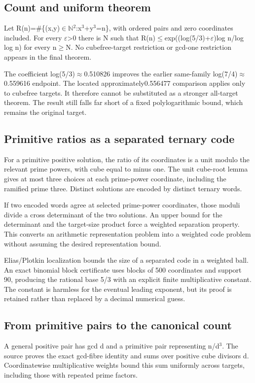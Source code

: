 \documentclass[11pt,a4paper]{article}
\begin{document}
\subsection{Count and uniform theorem}
Let R(n)=\#\{(x,y)\ensuremath{\in}\ensuremath{\mathbb{N}}\ensuremath{^2}:x\ensuremath{^3}+y\ensuremath{^3}=n\}, with ordered pairs and zero coordinates included. For every \ensuremath{\varepsilon}>0 there is N such that R(n)\ensuremath{\leq}exp((log(5/3)+\ensuremath{\varepsilon})log n/log log n) for every n\ensuremath{\geq}N. No cubefree-target restriction or gcd-one restriction appears in the final theorem.

The coefficient log(5/3)\ensuremath{\approx}0.510826 improves the earlier same-family log(7/4)\ensuremath{\approx}0.559616 endpoint. The located approximately0.556477 comparison applies only to cubefree targets. It therefore cannot be substituted as a stronger all-target theorem. The result still falls far short of a fixed polylogarithmic bound, which remains the original target.

\subsection{Primitive ratios as a separated ternary code}
For a primitive positive solution, the ratio of its coordinates is a unit modulo the relevant prime powers, with cube equal to minus one. The unit cube-root lemma gives at most three choices at each prime-power coordinate, including the ramified prime three. Distinct solutions are encoded by distinct ternary words.

If two encoded words agree at selected prime-power coordinates, those moduli divide a cross determinant of the two solutions. An upper bound for the determinant and the target-size product force a weighted separation property. This converts an arithmetic representation problem into a weighted code problem without assuming the desired representation bound.

Elias/Plotkin localization bounds the size of a separated code in a weighted ball. An exact binomial block certificate uses blocks of 500 coordinates and support 90, producing the rational base 5/3 with an explicit finite multiplicative constant. The constant is harmless for the eventual leading exponent, but its proof is retained rather than replaced by a decimal numerical guess.

\subsection{From primitive pairs to the canonical count}
A general positive pair has gcd d and a primitive pair representing n/d\ensuremath{^3}. The source proves the exact gcd-fibre identity and sums over positive cube divisors d. Coordinatewise multiplicative weights bound this sum uniformly across targets, including those with repeated prime factors.
\end{document}
